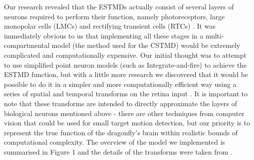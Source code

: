 \documentclass[a4paper,11pt]{article}
\begin{document}
	Our research revealed that the ESTMDs actually consist of several layers of neurons required to perform their function, namely photoreceptors, large monopolar cells (LMCs) and rectifying transient cells (RTCs) \cite{Wiederman2008}. It was immediately obvious to us that implementing all these stages in a multi-compartmental model (the method used for the CSTMD) would be extremely complicated and computationally expensive. Our initial thought was to attempt to use simplified point neuron models (such as Integrate-and-fire) to achieve the ESTMD function, but with a little more research we discovered that it would be possible to do it in a simpler and more computationally efficient way using a series of spatial and temporal transforms on the retina input \cite{Wiederman2008} \cite{hal11}. It is important to note that these transforms are intended to directly approximate the layers of biological neurons mentioned above - there are other techniques from computer vision that could be used for small target motion detection, but our priority is to represent the true function of the dragonfly's brain within realistic bounds of computational complexity. The overview of the model we implemented is summarised in Figure 1 and the details of the transforms were taken from \cite{hal11}. 
\end{document}
